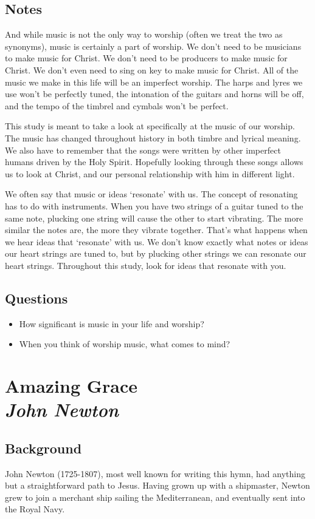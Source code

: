 \documentclass[10pt,a4paper,oneside,twocolumn]{book}
\newcommand\Chapter[2]{
  \chapter[#1: {\itshape#2}]{#1\\[2ex]\Large\itshape#2}
}
\begin{document}
\section{Notes}
And while music is not the only way to worship (often we treat the two as synonyms), music is certainly a part of worship. We don't need to be musicians to make music for Christ. We don't need to be producers to make music for Christ. We don't even need to sing on key to make music for Christ. All of the music we make in this life will be an imperfect worship. The harps and lyres we use won't be perfectly tuned, the intonation of the guitars and horns will be off, and the tempo of the timbrel and cymbals won't be perfect.

This study is meant to take a look at specifically at the music of our worship. The music has changed throughout history in both timbre and lyrical meaning. We also have to remember that the songs were written by other imperfect humans driven by the Holy Spirit. Hopefully looking through these songs allows us to look at Christ, and our personal relationship with him in different light.

We often say that music or ideas `resonate' with us. The concept of resonating has to do with instruments. When you have two strings of a guitar tuned to the same note, plucking one string will cause the other to start vibrating. The more similar the notes are, the more they vibrate together. That's what happens when we hear ideas that `resonate' with us. We don't know exactly what notes or ideas our heart strings are tuned to, but by plucking other strings we can resonate our heart strings. Throughout this study, look for ideas that resonate with you.

\section{Questions}
\begin{itemize}
\item How significant is music in your life and worship?

\item When you think of worship music, what comes to mind?
\end{itemize}

\Chapter{Amazing Grace}{John Newton}
\section{Background}
John Newton (1725-1807), most well known for writing this hymn, had anything but a straightforward path to Jesus. Having grown up with a shipmaster, Newton grew to join a merchant ship sailing the Mediterranean, and eventually sent into the Royal Navy.
\end{document}
